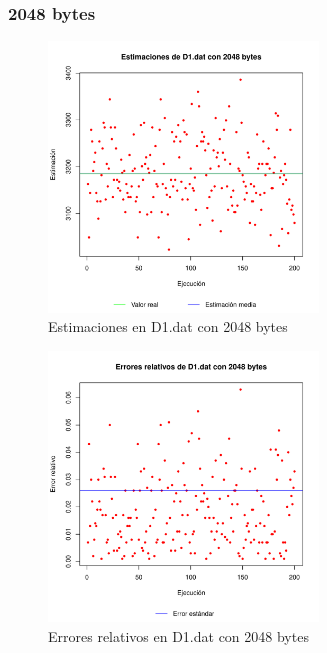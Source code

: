 \subsubsection{2048 bytes}
\begin{figure}[h!]
    \centering
        \includegraphics[width=0.64\textwidth]{../figs/D1/plot_estimation_2048.pdf}
        \caption{Estimaciones en D1.dat con 2048 bytes}
    \label{figura:D1_estimation_2048}
\end{figure}

\begin{figure}[h!]
    \centering
        \includegraphics[width=0.64\textwidth]{../figs/D1/plot_errors_2048.pdf}
        \caption{Errores relativos en D1.dat con 2048 bytes}
    \label{figura:D1_errors_2048}
\end{figure}

